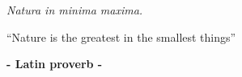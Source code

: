 %
%
%
%
%
%
%
%
%
%
%
%
%

{\pagestyle{empty}

\null{}
\begin{flushright}
\begin{Large}
\textit{Natura in minima maxima.}
\end{Large}

\vspace{0.1cm}

``Nature is the greatest in the smallest things''

\vspace{0.1cm}

\textbf{- Latin proverb -}
\end{flushright}
\null{}

\cleardoublepage}

\frontmatter 

\cleardoublepage
{}
\tableofcontents %

\mainmatter %
